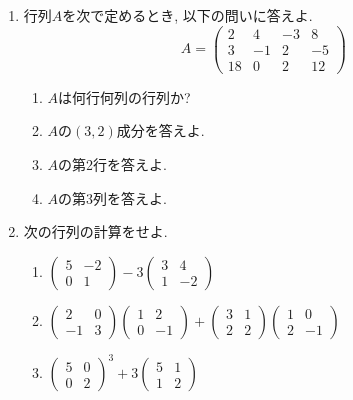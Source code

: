 \documentclass[dvipdfmx,a4paper,12pt]{article} %
\theoremstyle{definition}
\theoremstyle{definition}
\theoremstyle{remark}
\numberwithin{equation}{section}
\begin{document}
   \begin{enumerate}[label={\large \textbf{第}\arabic*\textbf{問}.}]
\item 行列$A$を次で定めるとき, 以下の問いに答えよ.
 $$
 A = 
 \begin{pmatrix}
 2 &4&-3&8 \\
 3&-1&2&-5 \\
  18&0&2&12
 \end{pmatrix}
 $$
 \begin{enumerate}[label=(\arabic*)]
   \setlength{\parskip}{0cm} %
  \setlength{\itemsep}{0cm} %
 \item $A$は何行何列の行列か?
 \item $A$の$(3,2)$成分を答えよ.
  \item $A$の第2行を答えよ.
 \item $A$の第3列を答えよ.
 \end{enumerate}
 
\item  次の行列の計算をせよ.

 \begin{enumerate}[label=(\arabic*)]
   \setlength{\parskip}{0cm} %
  \setlength{\itemsep}{0cm} %
\item 
$
 \begin{pmatrix} 5 & -2 \\ 0 & 1 \end{pmatrix}-  3 \begin{pmatrix} 3 & 4 \\ 1 & -2 \end{pmatrix}
$
\item $
\begin{pmatrix} 2 & 0 \\ -1 & 3 \end{pmatrix}\begin{pmatrix} 1 & 2 \\ 0 & -1 \end{pmatrix}
+  \begin{pmatrix} 3 & 1 \\ 2 & 2 \end{pmatrix}\begin{pmatrix} 1 & 0 \\ 2 & -1 \end{pmatrix}
$
\item $
\begin{pmatrix} 5 & 0 \\ 0 & 2 \end{pmatrix}^3 + 3 \begin{pmatrix} 5 & 1 \\ 1 & 2 \end{pmatrix}
$
 \end{enumerate}
 

\end{enumerate}
\end{document}
